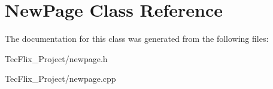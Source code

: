 \hypertarget{classNewPage}{}\section{New\+Page Class Reference}
\label{classNewPage}


The documentation for this class was generated from the following files\+:\begin{DoxyCompactItemize}
\item 
Tec\+Flix\+\_\+\+Project/newpage.\+h\item 
Tec\+Flix\+\_\+\+Project/newpage.\+cpp\end{DoxyCompactItemize}
